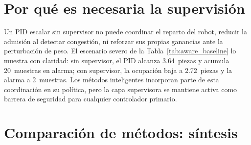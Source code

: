 \section{Por qué es necesaria la supervisión}

Un PID escalar sin supervisor no puede coordinar el reparto del robot, reducir la admisión al detectar congestión, ni reforzar sus propias ganancias ante la perturbación de peso. El escenario severo de la Tabla~\ref{tab:aware_baseline} lo muestra con claridad: sin supervisor, el PID alcanza 3.64~piezas y acumula 20~muestras en alarma; con supervisor, la ocupación baja a 2.72~piezas y la alarma a 2~muestras. Los métodos inteligentes incorporan parte de esta coordinación en su política, pero la capa supervisora se mantiene activa como barrera de seguridad para cualquier controlador primario.

\section{Comparación de métodos: síntesis}

